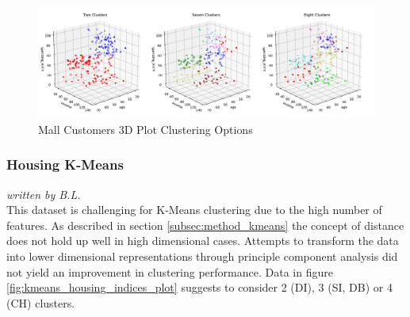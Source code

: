 \begin{figure}[h]
\caption{Mall Customers 3D Plot Clustering Options}
\begin{center}
\includegraphics[width=1.0\textwidth]{images/kmeans_mall_3d_multi.pdf}
\end{center}
\label{fig:kmeans_customers_3d_multi}
\end{figure}
\vspace{-0.5cm}


\subsubsection{Housing K-Means}
\textit{written by B.L.}\\

This dataset is challenging for K-Means clustering due to the high number of features. As described in section \ref{subsec:method_kmeans} the concept of distance does not hold up well in high dimensional cases. Attempts to transform the data into lower dimensional representations through principle component analysis did not yield an improvement in clustering performance. Data in figure \ref{fig:kmeans_housing_indices_plot} suggests to consider 2 (\gls{DI}), 3 (\gls{SI}, \gls{DB}) or 4 (\gls{CH}) clusters.


